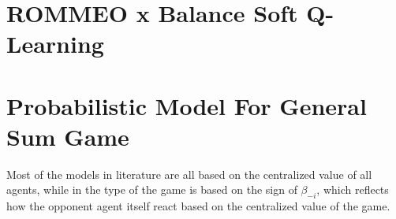 \section{ROMMEO \cite{tian2019regularized} x Balance Soft Q-Learning \cite{grau2018balancing}}

\section{Probabilistic Model For General Sum Game}
Most of the models in literature are all based on the centralized value of all agents, while in \cite{grau2018balancing} the type of the game is based on the sign of $\beta_{-i}$, which reflects how the opponent agent itself react based on the centralized value of the game. 